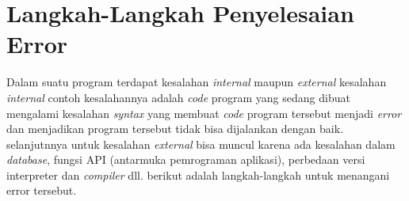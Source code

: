 \chapter{Langkah-Langkah Penyelesaian Error}

\par
Dalam suatu program terdapat kesalahan \textit{internal} maupun \textit{external} kesalahan \textit{internal} contoh kesalahannya adalah \textit{code} program yang sedang dibuat mengalami kesalahan \textit{syntax} yang membuat \textit{code} program tersebut menjadi \textit{error} dan menjadikan program tersebut tidak bisa dijalankan dengan baik. selanjutnnya untuk kesalahan \textit{external} bisa muncul karena ada kesalahan dalam \textit{database}, fungsi API (antarmuka pemrograman aplikasi), perbedaan versi interpreter dan \textit{compiler} dll. berikut adalah langkah-langkah untuk menangani error tersebut.

